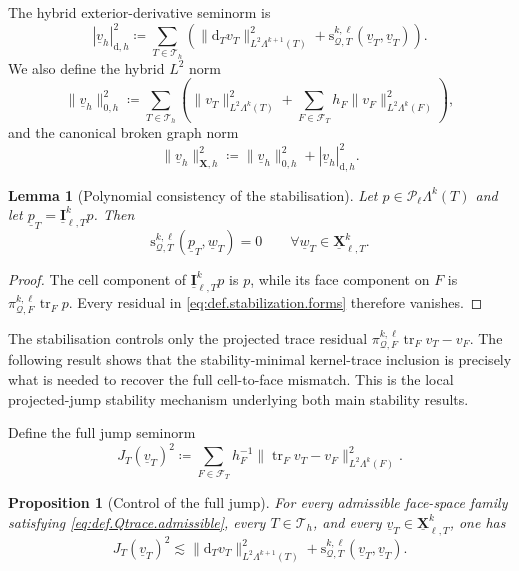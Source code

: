 \documentclass[a4paper,11pt]{article}
\newtheorem{proposition}[theorem]{Proposition}
\newtheorem{lemma}[theorem]{Lemma}
\theoremstyle{definition}
\newcommand{\DIFF}{\mathrm{d}}
\newcommand{\PL}[2]{\mathcal{P}_{#1}\Lambda^{#2}}
\newcommand{\uX}[2]{\underline{\boldsymbol{X}}_{\ell,#2}^{#1}}
\newcommand{\uI}[2]{\underline{\boldsymbol{I}}_{\ell,#2}^{#1}}
\newcommand{\piQ}[2]{\pi_{\mathcal Q,#1}^{#2,\ell}}
\newcommand{\trc}{\operatorname{tr}}
\begin{document}
The hybrid exterior-derivative seminorm is
\[
  |\underline v_h|_{\DIFF,h}^2
  \coloneqq
  \sum_{T\in\mathcal T_h}
  \left(
    \|\DIFF_Tv_T\|_{L^2\Lambda^{k+1}(T)}^2
    +
    \mathrm s_{\mathcal Q,T}^{k,\ell}
    (\underline v_T,\underline v_T)
  \right).
\]
We also define the hybrid $L^2$ norm
\[
  \|\underline v_h\|_{0,h}^2
  \coloneqq
  \sum_{T\in\mathcal T_h}
  \left(
    \|v_T\|_{L^2\Lambda^k(T)}^2
    +
    \sum_{F\in\mathcal F_T}
    h_F
    \|v_F\|_{L^2\Lambda^k(F)}^2
  \right),
\]
and the canonical broken graph norm
\[
  \|\underline v_h\|_{\boldsymbol X,h}^2
  \coloneqq
  \|\underline v_h\|_{0,h}^2
  +
  |\underline v_h|_{\DIFF,h}^2.
\]

\begin{lemma}[Polynomial consistency of the stabilisation]
\label{lem:stabilisation.polynomial.consistency}
Let $p\in\PL{\ell}{k}(T)$ and let $\underline p_T=\uI{k}{T}p$.
Then
\[
  \mathrm s_{\mathcal Q,T}^{k,\ell}
  (\underline p_T,\underline w_T)
  =0
  \qquad
  \forall\underline w_T\in\uX{k}{T}.
\]
\end{lemma}

\begin{proof}
The cell component of $\uI{k}{T}p$ is $p$, while its face component on $F$ is $\piQ{F}{k}\trc_Fp$.
Every residual in \eqref{eq:def.stabilization.forms} therefore vanishes.
\end{proof}

The stabilisation controls only the projected trace residual $  \piQ{F}{k}\trc_Fv_T-v_F$.
The following result shows that the stability-minimal kernel-trace inclusion is precisely what is needed to recover the full cell-to-face mismatch.
This is the local projected-jump stability mechanism underlying both main stability results.

Define the full jump seminorm
\[
  J_T(\underline v_T)^2
  \coloneqq
  \sum_{F\in\mathcal F_T}
  h_F^{-1}
  \|\trc_Fv_T-v_F\|_{L^2\Lambda^k(F)}^2.
\]

\begin{proposition}[Control of the full jump]
\label{prop:full.jump.control.forms}
For every admissible face-space family satisfying \eqref{eq:def.Qtrace.admissible}, every $T\in\mathcal T_h$, and every $\underline v_T\in\uX{k}{T}$, one has
\begin{equation}\label{eq:full.jump.control.forms}
  J_T(\underline v_T)^2
  \lesssim
  \|\DIFF_Tv_T\|_{L^2\Lambda^{k+1}(T)}^2
  +
  \mathrm s_{\mathcal Q,T}^{k,\ell}
  (\underline v_T,\underline v_T).
\end{equation}
\end{proposition}
\end{document}
